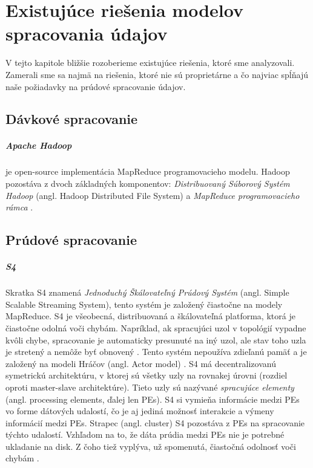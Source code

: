 \chapter{Existujúce riešenia modelov spracovania údajov}
\label{Existing solutions of data stream analysis} 
V tejto kapitole bližšie rozoberieme existujúce riešenia, ktoré sme analyzovali. Zamerali sme sa najmä na riešenia, ktoré nie sú proprietárne a čo najviac spĺňajú naše požiadavky na prúdové spracovanie údajov.

\section{Dávkové spracovanie}
\paragraph{Apache Hadoop} je open-source implementácia MapReduce programovacieho modelu. Hadoop pozostáva z dvoch základných komponentov: \textit{Distribuovaný Súborový Systém Hadoop} (angl. Hadoop Distributed File System) a \textit{MapReduce programovacieho rámca} \citep{liu2014survey}.

\section{Prúdové spracovanie}
\paragraph{S4}
Skratka S4 znamená \textit{Jednoduchý Škálovateľný Prúdový Systém} (angl. Simple Scalable Streaming System), tento systém je založený čiastočne na modely MapReduce. S4 je všeobecná, distribuovaná a škálovateľná platforma, ktorá je čiastočne odolná voči chybám. Napríklad, ak spracujúci uzol v topológií vypadne kvôli chybe, spracovanie je automaticky presunuté na iný uzol, ale stav toho uzla je stretený a nemôže byť obnovený \citep{neumeyer2010s4}. Tento systém nepoužíva zdieľanú pamäť a je založený na modeli Hráčov (angl. Actor model) \citep{agha1985actors}. S4 má decentralizovanú symetrickú architektúru, v ktorej sú všetky uzly na rovnakej úrovni (rozdiel oproti master-slave architektúre). Tieto uzly sú nazývané \textit{spracujúce elementy} (angl. processing elements, ďalej len PEs). S4 si vymieňa informácie medzi PEs vo forme dátových udalostí, čo je aj jediná možnosť interakcie a výmeny informácií medzi PEs. Strapec (angl. cluster) S4 pozostáva z PEs na spracovanie týchto udalostí. Vzhľadom na to, že dáta prúdia medzi PEs nie je potrebné ukladanie na disk. Z čoho tiež vyplýva, už spomenutá, čiastočná odolnosť voči chybám \citep{liu2014survey}. 

